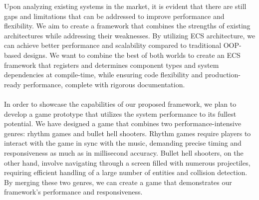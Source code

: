 Upon analyzing existing systems in the market, it is evident that there are still gaps and limitations 
that can be addressed to improve performance and flexibility.
We aim to create a framework that combines the strengths of existing architectures while addressing 
their weaknesses.
By utilizing ECS architecture, we can achieve better performance and scalability compared to 
traditional OOP-based designs.
We want to combine the best of both worlds \textemdash to create an ECS framework that registers and determines component types
and system dependencies at compile-time, while ensuring code flexibility and production-ready performance, complete
with rigorous documentation.
\\\\
In order to showcase the capabilities of our proposed framework, we plan to develop a game prototype that utilizes 
the system performance to its fullest potential.
We have designed a game that combines two performance-intensive genres: rhythm games and bullet hell shooters.
Rhythm games require players to interact with the game in sync with the music, demanding precise timing and 
responsiveness as much as in millisecond accuracy.
Bullet hell shooters, on the other hand, involve navigating through a screen filled with numerous projectiles, 
requiring efficient handling of a large number of entities and collision detection.
By merging these two genres, we can create a game that demonstrates our framework's performance and responsiveness.